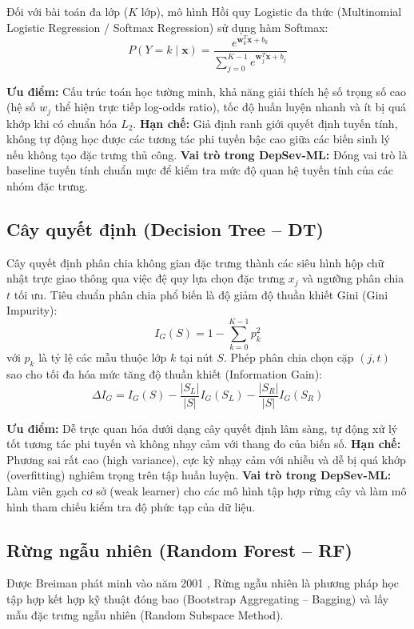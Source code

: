 Đối với bài toán đa lớp ($K$ lớp), mô hình Hồi quy Logistic đa thức (Multinomial Logistic Regression / Softmax Regression) sử dụng hàm Softmax:
\begin{equation}
    P(Y = k \mid \mathbf{x}) = \frac{e^{\mathbf{w}_k^T \mathbf{x} + b_k}}{\sum_{j=0}^{K-1} e^{\mathbf{w}_j^T \mathbf{x} + b_j}}
\end{equation}

\textbf{Ưu điểm:} Cấu trúc toán học tường minh, khả năng giải thích hệ số trọng số cao (hệ số $w_j$ thể hiện trực tiếp log-odds ratio), tốc độ huấn luyện nhanh và ít bị quá khớp khi có chuẩn hóa $L_2$.  
\textbf{Hạn chế:} Giả định ranh giới quyết định tuyến tính, không tự động học được các tương tác phi tuyến bậc cao giữa các biến sinh lý nếu không tạo đặc trưng thủ công.  
\textbf{Vai trò trong DepSev-ML:} Đóng vai trò là baseline tuyến tính chuẩn mực để kiểm tra mức độ quan hệ tuyến tính của các nhóm đặc trưng.

\subsection{Cây quyết định (Decision Tree -- DT)}
Cây quyết định phân chia không gian đặc trưng thành các siêu hình hộp chữ nhật trực giao thông qua việc đệ quy lựa chọn đặc trưng $x_j$ và ngưỡng phân chia $t$ tối ưu. Tiêu chuẩn phân chia phổ biến là độ giảm độ thuần khiết Gini (Gini Impurity):
\begin{equation}
    I_G(S) = 1 - \sum_{k=0}^{K-1} p_k^2
\end{equation}
với $p_k$ là tỷ lệ các mẫu thuộc lớp $k$ tại nút $S$. Phép phân chia chọn cặp $(j, t)$ sao cho tối đa hóa mức tăng độ thuần khiết (Information Gain):
\begin{equation}
    \Delta I_G = I_G(S) - \frac{|S_L|}{|S|} I_G(S_L) - \frac{|S_R|}{|S|} I_G(S_R)
\end{equation}

\textbf{Ưu điểm:} Dễ trực quan hóa dưới dạng cây quyết định lâm sàng, tự động xử lý tốt tương tác phi tuyến và không nhạy cảm với thang đo của biến số.  
\textbf{Hạn chế:} Phương sai rất cao (high variance), cực kỳ nhạy cảm với nhiễu và dễ bị quá khớp (overfitting) nghiêm trọng trên tập huấn luyện.  
\textbf{Vai trò trong DepSev-ML:} Làm viên gạch cơ sở (weak learner) cho các mô hình tập hợp rừng cây và làm mô hình tham chiếu kiểm tra độ phức tạp của dữ liệu.

\subsection{Rừng ngẫu nhiên (Random Forest -- RF)}
Được Breiman phát minh vào năm 2001 \cite{breiman2001random}, Rừng ngẫu nhiên là phương pháp học tập hợp kết hợp kỹ thuật đóng bao (Bootstrap Aggregating -- Bagging) và lấy mẫu đặc trưng ngẫu nhiên (Random Subspace Method). 


